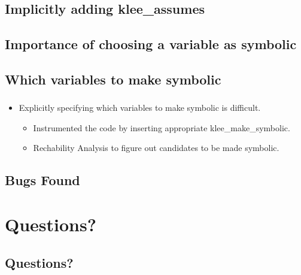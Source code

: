 \documentclass[mathserif,10pt]{beamer}
\newcommand{\cmt}[1]{}
\begin{document}
\subsection{Implicitly adding klee\_assumes}
\frame
{
  \frametitle{\subsecname}
  \lstII
    \cmt{
    Without the klee_assume, the dereference z->x may get resolved to many
      spurious memory objects. But while dealing with pointer analysis results
      we assume that the index of gptr is within bounds and as a result we are
      getting false positives that (The set of allocation sites corresponding
          to the memory object of the load address, z->x) is NOT a subset of
      (Points to allocation sites for the load address z->x) 
    }

}

\subsection{Importance of choosing a variable as symbolic}
\frame
{
  \frametitle{\subsecname}
  \lstI

}

\subsection{Which variables to make symbolic}
\frame
{
  \frametitle{\subsecname}
  \begin{itemize}
    \item Explicitly specifying which variables to make symbolic is difficult. 
    \vspace{1cm}
    \begin{itemize}
      \item Instrumented the code by inserting appropriate klee\_make\_symbolic.
      \item Rechability Analysis to figure out candidates to be made symbolic.
    \end{itemize}
  \end{itemize}
  \cmt{
    Rather that explicitly making the  inputs of the test program
      symbolic, let klee instrument the code by inserting klee_make_symbolic
      calls. The inputs that we are considering include command line arguments,
      file inputs, globals and variables used to read inputs (for example using
          scanf).
  }
}


\subsection{Bugs Found}
\frame
{
  \frametitle{\subsecname}
  \lstIII
}

\section{Questions?}
\subsection{Questions?}
\frame
{}
\end{document}
